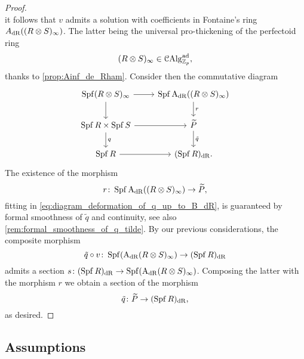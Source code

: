 \documentclass[10pt,a4paper]{amsart}
\numberwithin{equation}{subsection}
\theoremstyle{definition}
\begin{document}
\begin{proof}
\[        \]
    it follows that
    $v$ admits a solution with coefficients in Fontaine's ring $A_{\mathrm{dR}}((R \otimes S)_\infty)$. The latter being the universal pro-thickening of the perfectoid ring
        \[
            (R \otimes S)_\infty \in \mathcal C \mathrm{Alg}^{\mathrm{ad}}_{\mathbb Z_p},
        \]
    thanks to \cref{prop:Ainf_de_Rham}. Consider then the commutative diagram
        \begin{equation} \label{eq:diagram_deformation_of_q_up_to_B_dR}
        \begin{tikzcd}
            \Spf (R \otimes S)_\infty \ar{r} \ar{d} & \Spf \AdR((R \otimes S)_\infty) \ar{d}{r} \\
            \Spf R \times \Spf S \ar{r} \ar{d}{q} & \tP \ar{d}{\tilde{q}} \\
            \Spf R \ar{r} & (\Spf R)_\dR.
        \end{tikzcd}
        \end{equation}
    The existence of the morphism
        \[
            r \colon \operatorname{Spf} \mathrm{A}_{\mathrm{dR}}((R \otimes S)_\infty)  \to \widetilde{P},
        \]
    fitting in \eqref{eq:diagram_deformation_of_q_up_to_B_dR}, is guaranteed by formal smoothness of $\widetilde{q}$ and continuity, see also \cref{rem:formal_smoothness_of_q_tilde}. By our previous considerations, the composite morphism
        \[
            \tilde{q} \circ v \colon \operatorname{Spf} (\mathrm{A}_{\mathrm{dR}}(R \otimes S)_\infty)  \to (\operatorname{Spf} R)_{\mathrm{dR}}
        \]
    admits a section $s \colon (\operatorname{Spf} R)_{\mathrm{dR}} \to \operatorname{Spf}(\mathrm{A}_{\mathrm{dR}}(R \otimes S)_\infty)$. Composing the latter with the morphism $r$ we obtain a section of the morphism
        \[
            \tilde{q} \colon \widetilde{P} \to (\operatorname{Spf} R)_{\mathrm{dR}}  ,
        \]
    as desired.
\end{proof}

\subsection{Assumptions}
\end{document}
